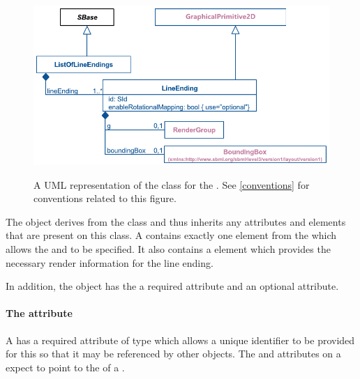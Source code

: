 \begin{figure}[!ht]
  \centering
  \includegraphics{images/render-line-endings-uml}\\
  \caption{A UML representation of the \LineEnding class for the \RenderPackage.  See \ref{conventions} for conventions related to this figure. }
  \label{fig:line_ending_render_uml}
\end{figure}


The \LineEnding object derives from the \GraphicalPrimitiveTwoD class
and thus inherits any attributes and elements that are present on this
class.
A \LineEnding contains exactly one  element from the \LayoutPackage which allows the  and  to be specified. It also contains a \RenderGroup element which provides the necessary render information for the line ending.
  
In addition, the \LineEnding object has the a required  attribute and an optional  attribute.

\paragraph{The \fixttspace{} attribute}

A \LineEnding has a required attribute  of type
 which allows a unique identifier to be provided for this \LineEnding so that it may be referenced by other objects. The  and  attributes on a \RenderCurve expect to point to the  of a \LineEnding.

